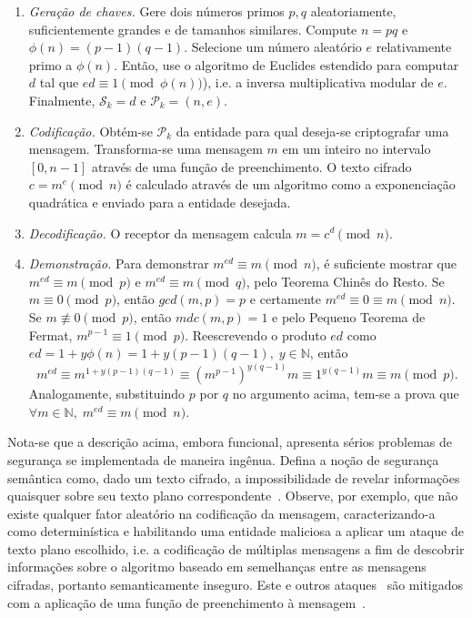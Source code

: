 \documentclass[12pt,notitlepage]{report}
\newcommand{\pk}{\mathcal{P}_k}
\begin{document}
\begin{enumerate}

  \item[] \emph{Geração de chaves.} Gere dois números primos $p, q$
      aleatoriamente, suficientemente grandes e de tamanhos similares. Compute
        $n = p q$ e $\phi(n) = (p - 1) (q - 1)$. Selecione um número aleatório
        $e$ relativamente primo a $\phi(n)$. Então, use o algoritmo de Euclides
        estendido para computar $d$ tal que $ed \equiv 1 \pmod{\phi(n)}$), i.e.
        a inversa multiplicativa modular de $e$. Finalmente, $\mathcal{S}_k =
        d$ e $\mathcal{P}_k = (n, e)$.

  \item[] \emph{Codificação.} Obtém-se $\pk{}$ da entidade para qual deseja-se
      criptografar uma mensagem. Transforma-se uma mensagem $m$ em um inteiro
        no intervalo $[0, n - 1]$ através de uma função de preenchimento.  O
        texto cifrado $c = m^e \pmod{n}$ é calculado através de um algoritmo
        como a exponenciação quadrática e enviado para a entidade desejada.

  \item[] \emph{Decodificação.} O receptor da mensagem calcula $m = c^d
      \pmod{n}$.

  \item[] \emph{Demonstração.} Para demonstrar $m^{ed} \equiv m \pmod{n}$, é
      suficiente mostrar que $m^{ed} \equiv m \pmod{p}$ e $m^{ed} \equiv m
        \pmod{q}$, pelo Teorema Chinês do Resto. Se $m \equiv 0 \pmod{p}$,
        então $gcd(m, p) = p$ e certamente $m^{ed} \equiv 0 \equiv m \pmod{n}$.
        Se $m \not\equiv 0 \pmod{p}$, então $mdc(m, p) = 1$ e pelo Pequeno
        Teorema de Fermat, $m^{p - 1} \equiv 1 \pmod{p}$. Reescrevendo o
        produto $ed$ como $ed = 1 + y\phi(n) = 1 + y(p - 1)(q - 1), \; y \in
        \mathbb{N}$, então
        \begin{equation}
          m^{ed} \equiv m^{1 + y(p-1)(q-1)} \equiv
            (m^{p-1})^{y(q-1)}m \equiv 1^{y(q-1)}m \equiv m \pmod{p}.
        \end{equation}
        Analogamente, substituindo $p$ por $q$ no argumento acima, tem-se a
        prova que $\forall m \in \mathbb{N}, \; m^{ed} \equiv m \pmod{n}$.

\end{enumerate}

Nota-se que a descrição acima, embora funcional, apresenta sérios problemas de
segurança se implementada de maneira ingênua. Defina a noção de segurança
semântica como, dado um texto cifrado, a impossibilidade de revelar
informações quaisquer sobre seu texto plano
correspondente~\cite{Goldwasser:1982:PEA:800070.802212}. Observe, por exemplo,
que não existe qualquer fator aleatório na codificação da mensagem,
caracterizando-a como determinística e habilitando uma entidade
maliciosa a aplicar um ataque de texto plano escolhido, i.e. a codificação
de múltiplas mensagens a fim de descobrir informações sobre o algoritmo
baseado em semelhanças entre as mensagens cifradas, portanto semanticamente
inseguro. Este e outros ataques~\cite{Boneh99twentyyears} são mitigados com
a aplicação de uma função de preenchimento à mensagem~\cite{Bellare1995}.
\end{document}
